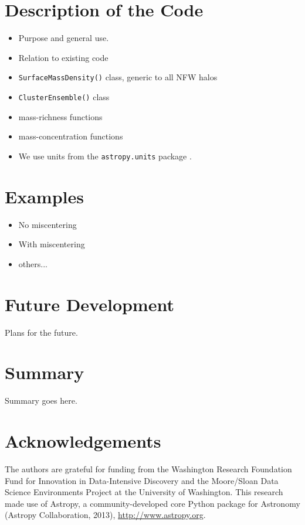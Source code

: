 \documentclass{emulateapj}
\begin{document}
\section{Description of the Code}
\label{code}

\begin{itemize} \itemsep -2pt
\item Purpose and general use.
\item Relation to existing code
\item \lstinline{SurfaceMassDensity()} class, generic to all NFW halos
\item \lstinline{ClusterEnsemble()} class
\item mass-richness functions
\item mass-concentration functions
\item We use units from the \lstinline{astropy.units} package \citep{astropy13}.
\end{itemize}

\section{Examples}
\label{ex}

\begin{itemize} \itemsep -2pt
\item No miscentering
\item With miscentering
\item others...
\end{itemize}

\section{Future Development}
\label{future}

Plans for the future.

\section{Summary}
\label{summary}

Summary goes here.


\section*{Acknowledgements}
The authors are grateful for funding from the Washington Research Foundation Fund for Innovation in Data-Intensive Discovery and the Moore/Sloan Data Science Environments Project at the University of Washington. This research made use of Astropy, a community-developed core Python package for Astronomy (Astropy Collaboration, 2013), \url{http://www.astropy.org}.




\end{document}
